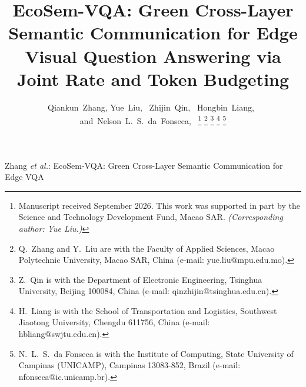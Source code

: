 \documentclass[10pt,journal,twocolumn]{IEEEtran}
\begin{document}
\title{EcoSem-VQA: Green Cross-Layer Semantic Communication for Edge Visual Question Answering via Joint Rate and Token Budgeting}

\author{Qiankun~Zhang,
        Yue~Liu,~
        Zhijin~Qin,~
        Hongbin~Liang,~
        and~Nelson~L.~S.~da~Fonseca,~%
\thanks{Manuscript received September 2026. This work was supported in part by the Science and Technology Development Fund, Macao SAR. \emph{(Corresponding author: Yue Liu.)}}%
\thanks{Q.\ Zhang and Y.\ Liu are with the Faculty of Applied Sciences, Macao Polytechnic University, Macao SAR, China (e-mail: yue.liu@mpu.edu.mo).}%
\thanks{Z.\ Qin is with the Department of Electronic Engineering, Tsinghua University, Beijing 100084, China (e-mail: qinzhijin@tsinghua.edu.cn).}%
\thanks{H.\ Liang is with the School of Transportation and Logistics, Southwest Jiaotong University, Chengdu 611756, China (e-mail: hbliang@swjtu.edu.cn).}%
\thanks{N.\ L.\ S.\ da Fonseca is with the Institute of Computing, State University of Campinas (UNICAMP), Campinas 13083-852, Brazil (e-mail: nfonseca@ic.unicamp.br).}}

%
{Zhang \MakeLowercase{\textit{et al.}}: EcoSem-VQA: Green Cross-Layer Semantic Communication for Edge VQA}

\maketitle
\end{document}
